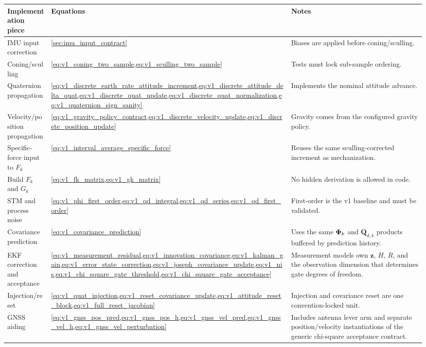 \begin{center}
\begin{tabular}{p{}p{}p{}}
\toprule
Implementation piece & Equations & Notes \\
\midrule
IMU input correction & \cref{sec:imu_input_contract} & Biases are applied before coning/sculling. \\
Coning/sculling & \cref{eq:v1_coning_two_sample,eq:v1_sculling_two_sample} & Tests must lock sub-sample ordering. \\
Quaternion propagation & \cref{eq:v1_discrete_earth_rate_attitude_increment,eq:v1_discrete_attitude_delta_quat,eq:v1_discrete_quat_update,eq:v1_discrete_quat_normalization,eq:v1_quaternion_sign_sanity} & Implements the nominal attitude advance. \\
Velocity/position propagation & \cref{eq:v1_gravity_policy_contract,eq:v1_discrete_velocity_update,eq:v1_discrete_position_update} & Gravity comes from the configured gravity policy. \\
Specific-force input to $F_k$ & \cref{eq:v1_interval_average_specific_force} & Reuses the same sculling-corrected increment as mechanization. \\
Build $F_k$ and $G_k$ & \cref{eq:v1_fk_matrix,eq:v1_gk_matrix} & No hidden derivation is allowed in code. \\
STM and process noise & \cref{eq:v1_phi_first_order,eq:v1_qd_integral,eq:v1_qd_series,eq:v1_qd_first_order} & First-order is the v1 baseline and must be validated. \\
Covariance prediction & \cref{eq:v1_covariance_prediction} & Uses the same $\boldsymbol{\Phi}_k$ and $\mathbf{Q}_{d,k}$ products buffered by prediction history. \\
EKF correction and acceptance & \cref{eq:v1_measurement_residual,eq:v1_innovation_covariance,eq:v1_kalman_gain,eq:v1_error_state_correction,eq:v1_joseph_covariance_update,eq:v1_nis,eq:v1_chi_square_gate_threshold,eq:v1_chi_square_gate_acceptance} & Measurement models own $\hat{\mathbf{z}}$, $H$, $R$, and the observation dimension that determines gate degrees of freedom. \\
Injection/reset & \cref{eq:v1_quat_injection,eq:v1_reset_covariance_update,eq:v1_attitude_reset_block,eq:v1_full_reset_jacobian} & Injection and covariance reset are one convention-locked unit. \\
GNSS aiding & \cref{eq:v1_gnss_pos_pred,eq:v1_gnss_pos_h,eq:v1_gnss_vel_pred,eq:v1_gnss_vel_h,eq:v1_gnss_vel_perturbation} & Includes antenna lever arm and separate position/velocity instantiations of the generic chi-square acceptance contract. \\
\bottomrule
\end{tabular}
\end{center}
